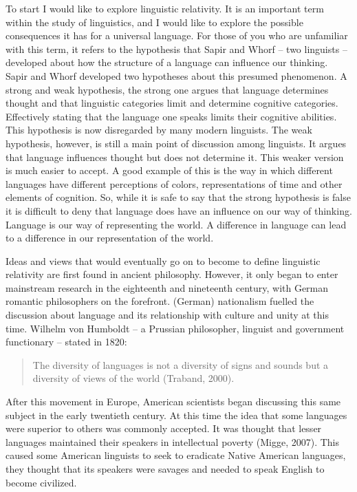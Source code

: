 To start I would like to explore linguistic relativity. It is an important term within the study of linguistics, and I would like to explore the possible consequences it has for a universal language. For those of you who are unfamiliar with this term, it refers to the hypothesis that Sapir and Whorf – two linguists – developed about how the structure of a language can influence our thinking. Sapir and Whorf developed two hypotheses about this presumed phenomenon. A strong and weak hypothesis, the strong one argues that language determines thought and that linguistic categories limit and determine cognitive categories. Effectively stating that the language one speaks limits their cognitive abilities. This hypothesis is now disregarded by many modern linguists. The weak hypothesis, however, is still a main point of discussion among linguists. It argues that language influences thought but does not determine it. This weaker version is much easier to accept. A good example of this is the way in which different languages have different perceptions of colors, representations of time and other elements of cognition. So, while it is safe to say that the strong hypothesis is false it is difficult to deny that language does have an influence on our way of thinking. Language is our way of representing the world. A difference in language can lead to a difference in our representation of the world. 

 
	Ideas and views that would eventually go on to become to define linguistic relativity are first found in ancient philosophy. However, it only began to enter mainstream research in the eighteenth and nineteenth century, with German romantic philosophers on the forefront. (German) nationalism fuelled the discussion about language and its relationship with culture and unity at this time. Wilhelm von Humboldt – a Prussian philosopher, linguist and government functionary – stated in 1820:  

\begin{quote}
\begin{singlespace}
The diversity of languages is not a diversity of signs and sounds but a diversity of views of the world (Traband, 2000). 
\end{singlespace}
\end{quote}

After this movement in Europe, American scientists began discussing this same subject in the early twentieth century. At this time the idea that some languages were superior to others was commonly accepted. It was thought that lesser languages maintained their speakers in intellectual poverty (Migge, 2007). This caused some American linguists to seek to eradicate Native American languages, they thought that its speakers were savages and needed to speak English to become civilized. 

